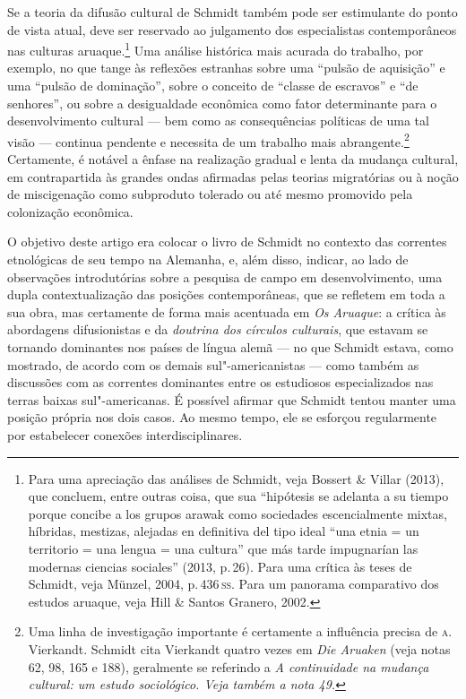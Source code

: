 Se a teoria da difusão cultural de Schmidt também pode ser estimulante
do ponto de vista atual, deve ser reservado ao julgamento dos
especialistas contemporâneos nas culturas aruaque.\footnote{Para uma
  apreciação das análises de Schmidt, veja Bossert \& Villar (2013), que
  concluem, entre outras coisa, que sua ``hipótesis se adelanta a su
  tiempo porque concibe a los grupos arawak como sociedades
  escencialmente mixtas, híbridas, mestizas, alejadas en definitiva del
  tipo ideal ``una etnia = un territorio = una lengua = una cultura'' que
  más tarde impugnarían las modernas ciencias sociales'' (2013, p.\,26).
  Para uma crítica às teses de Schmidt, veja Münzel, 2004, p.\,436\,\textsc{ss}.
  Para um panorama comparativo dos estudos aruaque, veja Hill \& Santos
  Granero, 2002.} Uma análise histórica mais acurada do trabalho, por
exemplo, no que tange às reflexões estranhas sobre uma ``pulsão de
aquisição'' e uma ``pulsão de dominação'', sobre o conceito de ``classe
de escravos'' e ``de senhores'', ou sobre a desigualdade econômica como
fator determinante para o desenvolvimento cultural --- bem como as
consequências políticas de uma tal visão --- continua pendente e
necessita de um trabalho mais abrangente.\footnote{Uma linha de
  investigação importante é certamente a influência precisa de \textsc{a}.\,Vierkandt. Schmidt cita Vierkandt quatro vezes em \textit{Die Aruaken}
  (veja notas 62, 98, 165 e 188), geralmente se referindo a \textit{A
  continuidade na mudança cultural: um estudo sociológico. Veja
  também a nota 49.}} Certamente, é notável a ênfase na realização
gradual e lenta da mudança cultural, em contrapartida às grandes ondas
afirmadas pelas teorias migratórias ou à noção de miscigenação como
subproduto tolerado ou até mesmo promovido pela colonização econômica.

O objetivo deste artigo era colocar o livro de Schmidt no contexto das
correntes etnológicas de seu tempo na Alemanha, e, além disso, indicar,
ao lado de observações introdutórias sobre a pesquisa de campo em
desenvolvimento, uma dupla contextualização das posições contemporâneas,
que se refletem em toda a sua obra, mas certamente de forma mais
acentuada em \textit{Os Aruaque}: a crítica às abordagens difusionistas e
da \textit{doutrina dos círculos culturais}, que estavam se tornando dominantes
nos países de língua alemã --- no que Schmidt estava, como mostrado, de
acordo com os demais sul"-americanistas --- como também as discussões com
as correntes dominantes entre os estudiosos especializados nas terras
baixas sul"-americanas. É possível afirmar que Schmidt tentou manter uma
posição própria nos dois casos. Ao mesmo tempo, ele se esforçou
regularmente por estabelecer conexões interdisciplinares.

